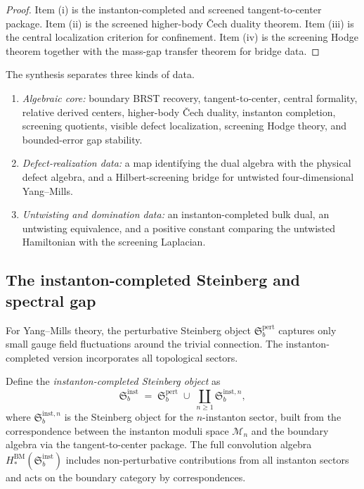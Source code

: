 \begin{proof}
Item (i) is the instanton-completed and screened tangent-to-center package.
Item (ii) is the screened higher-body \v{C}ech duality theorem.
Item (iii) is the central localization criterion for confinement.
Item (iv) is the screening Hodge theorem together with the mass-gap transfer theorem for bridge data.
\end{proof}

\begin{remark}
\label{rem:ym-synthesis-boundary-data-stratification}
The synthesis separates three kinds of data.
\begin{enumerate}[label=(\alph*)]
\item \emph{Algebraic core:} boundary BRST recovery, tangent-to-center, central formality,
relative derived centers, higher-body \v{C}ech duality, instanton completion, screening quotients,
visible defect localization, screening Hodge theory, and bounded-error gap stability.
\item \emph{Defect-realization data:} a map identifying the dual algebra with the physical defect algebra,
and a Hilbert-screening bridge for untwisted four-dimensional Yang--Mills.
\item \emph{Untwisting and domination data:} an instanton-completed bulk dual, an untwisting equivalence,
and a positive constant comparing the untwisted Hamiltonian with the screening Laplacian.
\end{enumerate}
\end{remark}

\subsection{The instanton-completed Steinberg and spectral gap}
\label{subsec:instanton-steinberg-spectral-gap}

\providecommand{\Steinb}{\mathfrak{S}}

For Yang--Mills theory, the perturbative Steinberg object $\Steinb_b^{\mathrm{pert}}$
captures only small gauge field fluctuations around the trivial connection.
The instanton-completed version incorporates all topological sectors.

\begin{construction}
\label{con:instanton-completed-steinberg}
Define the \emph{instanton-completed Steinberg object} as
\[
 \Steinb_b^{\mathrm{inst}}
 \;=\;
 \Steinb_b^{\mathrm{pert}}
 \;\cup\;
 \coprod_{n \geq 1} \Steinb_b^{\mathrm{inst},n},
\]
where $\Steinb_b^{\mathrm{inst},n}$ is the Steinberg object for the $n$-instanton sector,
built from the correspondence between the instanton moduli space $\mathcal{M}_n$
and the boundary algebra via the tangent-to-center package.
The full convolution algebra $H_*^{\mathrm{BM}}(\Steinb_b^{\mathrm{inst}})$
includes non-perturbative contributions from all instanton sectors
and acts on the boundary category by correspondences.
\end{construction}

